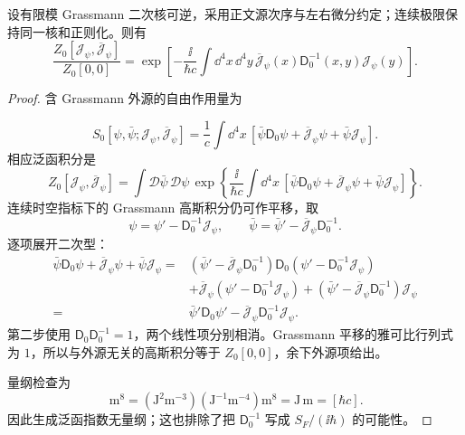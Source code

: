 \begin{proposition}
设有限模 Grassmann 二次核可逆，采用正文源次序与左右微分约定；连续极限保持同一核和正则化。则有
\begin{equation}
 {
 \frac{Z_0[\mathcal J_\psi,\overline{\mathcal J}_\psi]}{Z_0[0,0]}
 =\exp\!\left[
 -\frac{\ii}{\hbar c}
 \int\dd^4 x\,\dd^4 y\,
 \overline{\mathcal J}_\psi(x)\mathsf D_0^{-1}(x,y)\mathcal J_\psi(y)
 \right].}
\label{eq:dirac-free-generating-functional-dp42}
\end{equation}
\end{proposition}
\begin{proof}
含 Grassmann 外源的自由作用量为

\begin{equation*}
 S_0[\psi,\bar\psi;\mathcal J_\psi,\overline{\mathcal J}_\psi]
 =\frac1c\int\dd^4 x\,
 \left[
 \bar\psi\mathsf D_0\psi+\overline{\mathcal J}_\psi\psi+\bar\psi\mathcal J_\psi
 \right].
\end{equation*}
相应泛函积分是
\begin{equation*}
 Z_0[\mathcal J_\psi,\overline{\mathcal J}_\psi]
 =\int\mathcal D\bar\psi\,\mathcal D\psi\,
 \exp\!\left\{\frac{\ii}{\hbar c}
 \int\dd^4 x\,
 [\bar\psi\mathsf D_0\psi+\overline{\mathcal J}_\psi\psi+\bar\psi\mathcal J_\psi]\right\}.
\end{equation*}
连续时空指标下的 Grassmann 高斯积分仍可作平移，取
\begin{equation*}
 \psi=\psi'-\mathsf D_0^{-1}\mathcal J_\psi,
 \qquad
 \bar\psi=\bar\psi'-\overline{\mathcal J}_\psi\mathsf D_0^{-1}.
\end{equation*}
逐项展开二次型：
\begin{align*}
 \bar\psi\mathsf D_0\psi
 +\overline{\mathcal J}_\psi\psi+\bar\psi\mathcal J_\psi
 ={}&
 (\bar\psi'-\overline{\mathcal J}_\psi\mathsf D_0^{-1})
 \mathsf D_0(\psi'-\mathsf D_0^{-1}\mathcal J_\psi)\\
 &+\overline{\mathcal J}_\psi(\psi'-\mathsf D_0^{-1}\mathcal J_\psi)
 +(\bar\psi'-\overline{\mathcal J}_\psi\mathsf D_0^{-1})\mathcal J_\psi\\
 ={}&\bar\psi'\mathsf D_0\psi'
 -\overline{\mathcal J}_\psi\mathsf D_0^{-1}\mathcal J_\psi.
\end{align*}
第二步使用 $\mathsf D_0\mathsf D_0^{-1}=1$，两个线性项分别相消。Grassmann 平移的雅可比行列式为 $1$，所以与外源无关的高斯积分等于 $Z_0[0,0]$，余下外源项给出。

量纲检查为
\begin{equation*}
 [\mathcal J_\psi][\overline{\mathcal J}_\psi][\mathsf D_0^{-1}]\,\mathrm{m^8}
 =(\mathrm{J^2m^{-3}})(\mathrm{J^{-1}m^{-4}})\mathrm{m^8}
 =\mathrm{J\,m}
 =[\hbar c].
\end{equation*}
因此生成泛函指数无量纲；这也排除了把 $\mathsf D_0^{-1}$ 写成 $S_F/(\ii\hbar)$ 的可能性。
\end{proof}

